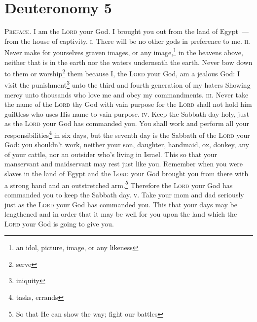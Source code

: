 \section{Deuteronomy 5}\label{Deuteronomy 5}
\begin{enumerate}[align=center]
     \textsc{Preface.} I am the \textsc{Lord} your God. I brought you out from the land of Egypt~--- from the house of captivity.%
     \textsc{i.} There will be no other gods in preference to me.%
     \textsc{ii.} Never make for yourselves graven images, or any image,\footnote{an idol, picture, image, or any likeness} in the heavens above, neither that is in the earth nor the waters underneath the earth.%
     Never bow down to them or worship\footnote{serve} them because I, the \textsc{Lord} your God, am a jealous God: I visit the punishment\footnote{iniquity} unto the third and fourth generation of my haters%
     Showing mercy unto thousands who love me and obey my commandments.%
     \textsc{iii.} Never take the name of the \textsc{Lord} thy God with vain purpose for the \textsc{Lord} shall not hold him guiltless who uses His name to vain purpose.%
     \textsc{iv.} Keep the Sabbath day holy, just as the \textsc{Lord} your God has commanded you.%
     You shall work and perform all your responsibilities\footnote{tasks, errands} in six days,%
     but the seventh day is the Sabbath of the \textsc{Lord} your God: you shouldn't work, neither your son, daughter, handmaid, ox, donkey, any of your cattle, nor an outsider who's living in Israel. This so that your manservant and maidservant may rest just like you.%
     Remember when you were slaves in the land of Egypt and the \textsc{Lord} your God brought you from there with a strong hand and an outstretched arm.\footnote{So that He can show the way; fight our battles} Therefore the \textsc{Lord} your God has commanded you to keep the Sabbath day.%
     \textsc{v.} Take your mom and dad seriously just as the \textsc{Lord} your God has commanded you. This that your days may be lengthened and in order that it may be well for you upon the land which the \textsc{Lord} your God is going to give you.%

\end{enumerate}
